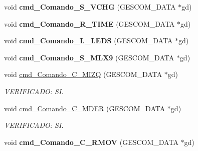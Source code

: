 \begin{DoxyCompactItemize}
\item 
void {\bfseries cmd\+\_\+\+Comando\+\_\+\+S\+\_\+\+V\+C\+HG} (G\+E\+S\+C\+O\+M\+\_\+\+D\+A\+TA $\ast$gd)\hypertarget{_gescom___m_e_g_a2560___v3___interfaz_8ino_a2c8e0cf02cde535e4eaff6fb8b7f0adc}{}\label{_gescom___m_e_g_a2560___v3___interfaz_8ino_a2c8e0cf02cde535e4eaff6fb8b7f0adc}

\item 
void {\bfseries cmd\+\_\+\+Comando\+\_\+\+R\+\_\+\+T\+I\+ME} (G\+E\+S\+C\+O\+M\+\_\+\+D\+A\+TA $\ast$gd)\hypertarget{_gescom___m_e_g_a2560___v3___interfaz_8ino_a4bca73c989666a2969dbc1ac7fa94af3}{}\label{_gescom___m_e_g_a2560___v3___interfaz_8ino_a4bca73c989666a2969dbc1ac7fa94af3}

\item 
void {\bfseries cmd\+\_\+\+Comando\+\_\+\+L\+\_\+\+L\+E\+DS} (G\+E\+S\+C\+O\+M\+\_\+\+D\+A\+TA $\ast$gd)\hypertarget{_gescom___m_e_g_a2560___v3___interfaz_8ino_af1f0e8938dcb96dae770470fbc2ccb8e}{}\label{_gescom___m_e_g_a2560___v3___interfaz_8ino_af1f0e8938dcb96dae770470fbc2ccb8e}

\item 
void {\bfseries cmd\+\_\+\+Comando\+\_\+\+S\+\_\+\+M\+L\+X9} (G\+E\+S\+C\+O\+M\+\_\+\+D\+A\+TA $\ast$gd)\hypertarget{_gescom___m_e_g_a2560___v3___interfaz_8ino_acb509ac66221f928e1aa18fa649176f4}{}\label{_gescom___m_e_g_a2560___v3___interfaz_8ino_acb509ac66221f928e1aa18fa649176f4}

\item 
void \hyperlink{_gescom___m_e_g_a2560___v3___interfaz_8ino_a3489b010361bf072d159295afd7086a7}{cmd\+\_\+\+Comando\+\_\+\+C\+\_\+\+M\+I\+ZQ} (G\+E\+S\+C\+O\+M\+\_\+\+D\+A\+TA $\ast$gd)\hypertarget{_gescom___m_e_g_a2560___v3___interfaz_8ino_a3489b010361bf072d159295afd7086a7}{}\label{_gescom___m_e_g_a2560___v3___interfaz_8ino_a3489b010361bf072d159295afd7086a7}

\begin{DoxyCompactList}\small\item\em V\+E\+R\+I\+F\+I\+C\+A\+DO\+: SI. \end{DoxyCompactList}\item 
void \hyperlink{_gescom___m_e_g_a2560___v3___interfaz_8ino_a24e35e85f799a97fbf24ffa7fb32bea7}{cmd\+\_\+\+Comando\+\_\+\+C\+\_\+\+M\+D\+ER} (G\+E\+S\+C\+O\+M\+\_\+\+D\+A\+TA $\ast$gd)\hypertarget{_gescom___m_e_g_a2560___v3___interfaz_8ino_a24e35e85f799a97fbf24ffa7fb32bea7}{}\label{_gescom___m_e_g_a2560___v3___interfaz_8ino_a24e35e85f799a97fbf24ffa7fb32bea7}

\begin{DoxyCompactList}\small\item\em V\+E\+R\+I\+F\+I\+C\+A\+DO\+: SI. \end{DoxyCompactList}\item 
void {\bfseries cmd\+\_\+\+Comando\+\_\+\+C\+\_\+\+R\+M\+OV} (G\+E\+S\+C\+O\+M\+\_\+\+D\+A\+TA $\ast$gd)\hypertarget{_gescom___m_e_g_a2560___v3___interfaz_8ino_a7e318e5158915a5ff22b546547ccdc61}{}\label{_gescom___m_e_g_a2560___v3___interfaz_8ino_a7e318e5158915a5ff22b546547ccdc61}

\end{DoxyCompactItemize}


